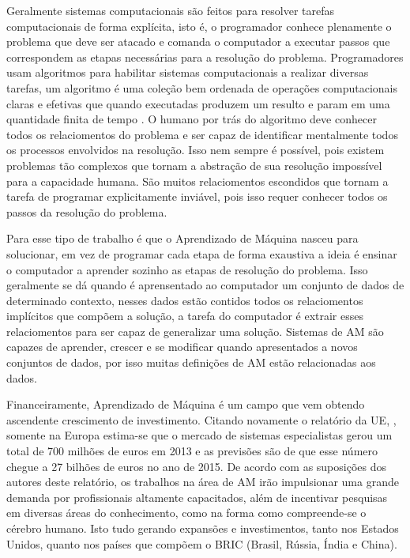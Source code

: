 Geralmente sistemas computacionais são feitos para resolver tarefas computacionais de forma explícita, isto é, o programador conhece plenamente o problema que deve ser atacado e comanda o computador a executar passos que correspondem as etapas necessárias para a resolução do problema. Programadores usam algoritmos para habilitar sistemas computacionais a realizar diversas tarefas, um algoritmo é uma coleção bem ordenada de operações computacionais claras e efetivas que quando executadas produzem um resulto e param em uma quantidade finita de tempo \cite{schn1995}. O humano por trás do algoritmo deve conhecer todos os relaciomentos do problema e ser capaz de identificar mentalmente todos os processos envolvidos na resolução. Isso nem sempre é possível, pois existem problemas tão complexos que tornam a abstração de sua resolução impossível para a capacidade humana. São muitos relaciomentos escondidos que tornam a tarefa de programar explicitamente inviável, pois isso requer conhecer todos os passos da resolução do problema.

Para esse tipo de trabalho é que o Aprendizado de Máquina nasceu para solucionar, em vez de programar cada etapa de forma exaustiva a ideia é ensinar o computador a aprender sozinho as etapas de resolução do problema. Isso geralmente se dá quando é aprensentado ao computador um conjunto de dados de determinado contexto, nesses dados estão contidos todos os relaciomentos implícitos que compõem a solução, a tarefa do computador é extrair esses relaciomentos para ser capaz de generalizar uma solução. Sistemas de AM são capazes de aprender, crescer e se modificar quando apresentados a novos conjuntos de dados, por isso muitas definições de AM estão relacionadas aos dados.

Financeiramente, Aprendizado de Máquina é um campo que vem obtendo ascendente crescimento de investimento. Citando novamente o relatório da UE, , somente na Europa estima-se que o mercado de sistemas especialistas gerou um total de 700 milhões de euros em 2013 e as previsões são de que esse número chegue a 27 bilhões de euros no ano de 2015. De acordo com as suposições dos autores deste relatório, os trabalhos na área de AM irão impulsionar uma grande demanda por profissionais altamente capacitados, além de incentivar pesquisas em diversas áreas do conhecimento, como na forma como compreende-se o cérebro humano. Isto tudo gerando expansões e investimentos, tanto nos Estados Unidos, quanto nos países que compõem o BRIC (Brasil, Rússia, Índia e China). 

